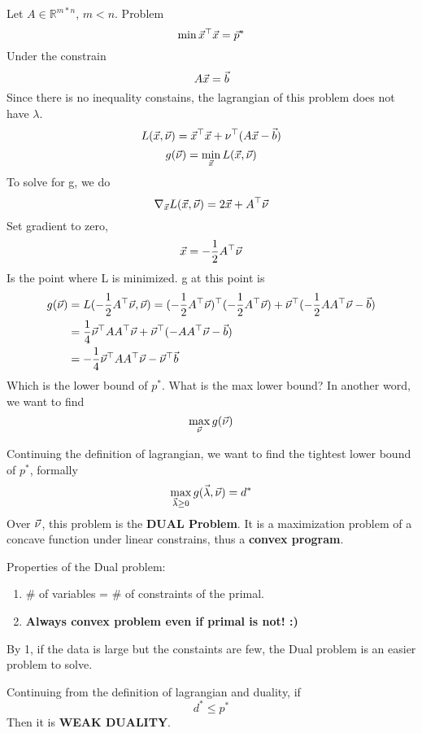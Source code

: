 \begin{example}
	Let $A\in\mathbb{R}^{m*n}$, $m<n$. Problem
	\[
\min \vec{x}^\top\vec{x} = \vec{p}^*
	\]
	Under the constrain
	\[
A\vec{x} = \vec{b}
	\]
	Since there is no inequality constains, the lagrangian of this problem does not have $\lambda$.
	\[
L(\vec{x},\vec{\nu}) = \vec{x}^\top\vec{x} + \nu^\top(A\vec{x}-\vec{b})
	\]
	\[
g(\vec{\nu}) = \min_{\vec{x}}L(\vec{x},\vec{\nu})
	\]
	To solve for g, we do
	\[
\nabla_{\vec{x}} L(\vec{x},\vec{\nu}) = 2\vec{x}+A^\top\vec{\nu}
	\]
	Set gradient to zero,
	\[
\vec{x} = -\frac{1}{2}A^\top\vec{\nu}
	\]
	Is the point where L is minimized. g at this point is 
	\begin{align*}
		g(\vec{\nu}) &= L(-\frac{1}{2}A^\top\vec{\nu}, \vec{\nu}) = (-\frac{1}{2}A^\top\vec{\nu})^\top(-\frac{1}{2}A^\top\vec{\nu})+\vec{\nu}^\top(-\frac{1}{2}AA^\top\vec{\nu}-\vec{b})\\
		&=\frac{1}{4}\vec{\nu}^\top A A^\top\vec{\nu} +\vec{\nu}^\top(-AA^\top\vec{\nu}-\vec{b})\\
		&= -\frac{1}{4}\vec{\nu}^\top A A^\top\vec{\nu} - \vec{\nu}^\top\vec{b}
	\end{align*}
	Which is the lower bound of $p^*$. What is the max lower bound? In another word, we want to find
	\[
\max_{\vec{\nu}}g(\vec{\nu})
	\]
\end{example}

\begin{definition}[Dual]
	Continuing the definition of lagrangian, we want to find the tightest lower bound of $p^*$, formally
	\[
\max_{\vec{\lambda}\ge0}g(\vec{\lambda},\vec{\nu}) = d^*
	\]
	Over $\vec{\nu}$, this problem is the \textbf{DUAL Problem}. It is a maximization problem of a concave function under linear constrains, thus a \textbf{convex program}.
\end{definition}

\begin{remark}
	Properties of the Dual problem:
	\begin{enumerate}
		\item \# of variables = \# of constraints of the primal.
		\item \textbf{Always convex problem even if primal is not! :)}
	\end{enumerate}
	By 1, if the data is large but the constaints are few, the Dual problem is an easier problem to solve.
\end{remark}

\begin{definition}
	Continuing from the definition of lagrangian and duality, if
	\[
d^*\le p^*
	\]
	Then it is \textbf{WEAK DUALITY}.
\end{definition}




